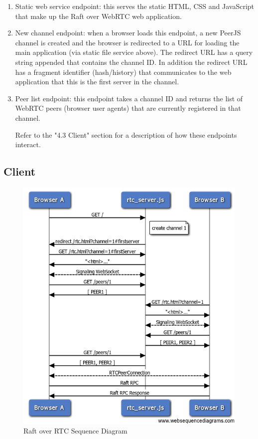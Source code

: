 \documentclass{acmtog} %
\begin{document}
\begin{enumerate}
\item Static web service endpoint: this serves the static HTML, CSS and JavaScript that make up the Raft over WebRTC web application.

\item New channel endpoint: when a browser loads this endpoint, a new PeerJS channel is created and the browser is redirected to a URL for loading the main application (via static file service above).  The redirect URL has a query string appended that contains the channel ID. In addition the redirect URL has a fragment identifier (hash/history) that communicates to the web application that this is the first server in the channel.

\item Peer list endpoint: this endpoint takes a channel ID and returns the list of WebRTC peers (browser user agents) that are currently registered in that channel.

Refer to the "4.3 Client" section for a description of how these
endpoints interact.
\end{enumerate}

\subsection{Client}

\begin{figure}[Ht]
\centerline{\includegraphics[width=15cm]{raft_rtc_sequence}}
\caption{Raft over RTC Sequence Diagram}
  \label{fig:raft_rtc_sequence}
\end{figure}
\end{document}
